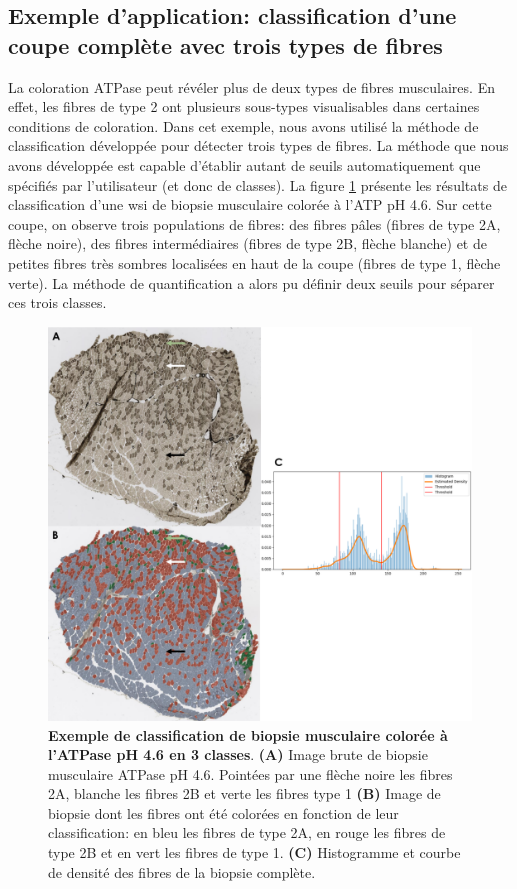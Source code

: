 \subsection{Exemple d'application: classification d'une coupe complète avec trois types de fibres}
La coloration ATPase peut révéler plus de deux types de fibres musculaires. En effet, les fibres de type 2 ont plusieurs sous-types visualisables dans certaines conditions de coloration. Dans cet exemple, nous avons utilisé la méthode de classification développée pour détecter trois types de fibres. La méthode que nous avons développée est capable d'établir autant de seuils automatiquement que spécifiés par l'utilisateur (et donc de classes). La figure \ref{fig:atp_paint_wsi} présente les résultats de classification d'une \gls{wsi} de biopsie musculaire colorée à l'ATP pH 4.6. Sur cette coupe, on observe trois populations de fibres: des fibres pâles (fibres de type 2A, flèche noire), des fibres intermédiaires (fibres de type 2B, flèche blanche) et de petites fibres très sombres localisées en haut de la coupe (fibres de type 1, flèche verte). La méthode de quantification a alors pu définir deux seuils pour séparer ces trois classes. 
\begin{figure}[!htbp]
 \centering
 \includegraphics[width=1\textwidth]{figures/atp_wsi.png}
 \caption[Exemple de classification de biopsie musculaire colorée à l'ATPase]{\textbf{Exemple de classification de biopsie musculaire colorée à l'ATPase pH 4.6 en 3 classes}. \textbf{(A)} Image brute de biopsie musculaire ATPase pH 4.6. Pointées par une flèche noire les fibres 2A, blanche les fibres 2B et verte les fibres type 1 \textbf{(B)} Image de biopsie dont les fibres ont été colorées en fonction de leur classification: en bleu les fibres de type 2A, en rouge les fibres de type 2B et en vert les fibres de type 1. \textbf{(C)} Histogramme et courbe de densité des fibres de la biopsie complète.}
 \label{fig:atp_paint_wsi}
\end{figure}

